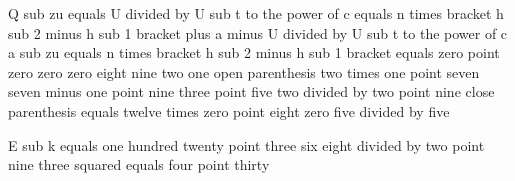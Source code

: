 Q sub zu equals U divided by U sub t to the power of c equals n times bracket h sub 2 minus h sub 1 bracket plus a minus U divided by U sub t to the power of c
a sub zu equals n times bracket h sub 2 minus h sub 1 bracket equals zero point zero zero zero eight nine two one open parenthesis two times one point seven seven minus one point nine three point five two divided by two point nine close parenthesis equals twelve times zero point eight zero five divided by five

E sub k equals one hundred twenty point three six eight divided by two point nine three squared equals four point thirty
